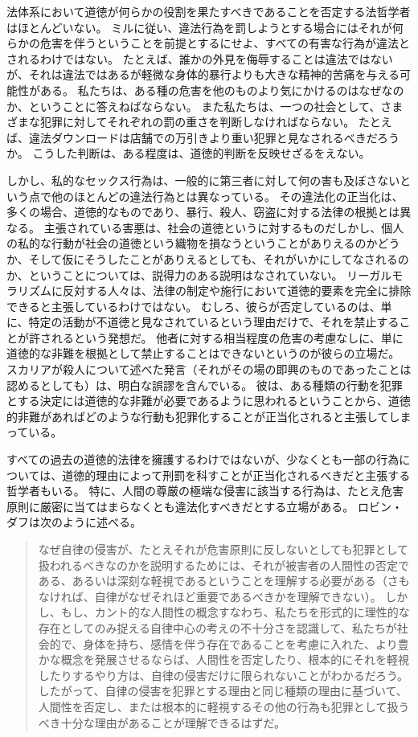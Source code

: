 \documentclass[paper=a4,book,openany]{jlreq} \usepackage{mystyle}
\begin{document}
法体系において道徳が何らかの役割を果たすべきであることを否定する法哲学者はほとんどいない。
ミルに従い、違法行為を罰しようとする場合にはそれが何らかの危害を伴うということを前提とするにせよ、すべての有害な行為が違法とされるわけではない。
たとえば、誰かの外見を侮辱することは違法ではないが、それは違法ではあるが軽微な身体的暴行よりも大きな精神的苦痛を与える可能性がある。
私たちは、ある種の危害を他のものより気にかけるのはなぜなのか、ということに答えねばならない。
また私たちは、一つの社会として、さまざまな犯罪に対してそれぞれの罰の重さを判断しなければならない。
たとえば、違法ダウンロードは店舗での万引きより重い犯罪と見なされるべきだろうか。
こうした判断は、ある程度は、道徳的判断を反映せざるをえない。

しかし、私的なセックス行為は、一般的に第三者に対して何の害も及ぼさないという点で他のほとんどの違法行為とは異なっている。
その違法化の正当化は、多くの場合、道徳的なものであり、暴行、殺人、窃盗に対する法律の根拠とは異なる。
主張されている害悪は、社会の道徳というに対するものだ{\DDASH}しかし、個人の私的な行動が社会の道徳という織物を損なうということがありえるのかどうか、そして仮にそうしたことがありえるとしても、それがいかにしてなされるのか、ということについては、説得力のある説明はなされていない。
リーガルモラリズムに反対する人々は、法律の制定や施行において道徳的要素を完全に排除できると主張しているわけではない。
むしろ、彼らが否定しているのは、単に、特定の活動が不道徳と見なされているという理由だけで、それを禁止することが許されるという発想だ。
他者に対する相当程度の危害の考慮なしに、単に道徳的な非難を根拠として禁止することはできないというのが彼らの立場だ。
スカリアが殺人について述べた発言（それがその場の即興のものであったことは認めるとしても）は、明白な誤謬を含んでいる。
彼は、ある種類の行動を犯罪とする決定には道徳的な非難が必要であるように思われるということから、道徳的非難があればどのような行動も犯罪化することが正当化されると主張してしまっている。

すべての過去の道徳的法律を擁護するわけではないが、少なくとも一部の行為については、道徳的理由によって刑罰を科すことが正当化されるべきだと主張する哲学者もいる。
特に、人間の尊厳の極端な侵害に該当する行為は、たとえ危害原則に厳密に当てはまらなくとも違法化すべきだとする立場がある。
ロビン・ダフは次のように述べる。

\begin{quote}
なぜ自律の侵害が、たとえそれが危害原則に反しないとしても犯罪として扱われるべきなのかを説明するためには、それが被害者の人間性の否定である、あるいは深刻な軽視であるということを理解する必要がある（さもなければ、自律がなぜそれほど重要であるべきかを理解できない）。
しかし、もし、カント的な人間性の概念{\DDASH}すなわち、私たちを形式的に理性的な存在としてのみ捉える自律中心の考え{\DDASH}の不十分さを認識して、私たちが社会的で、身体を持ち、感情を伴う存在であることを考慮に入れた、より豊かな概念を発展させるならば、人間性を否定したり、根本的にそれを軽視したりするやり方は、自律の侵害だけに限られないことがわかるだろう。
したがって、自律の侵害を犯罪とする理由と同じ種類の理由に基づいて、人間性を否定し、または根本的に軽視するその他の行為も犯罪として扱うべき十分な理由があることが理解できるはずだ。
\citep[p.43]{duff01:_harms_wrong}
\end{quote}
\end{document}
